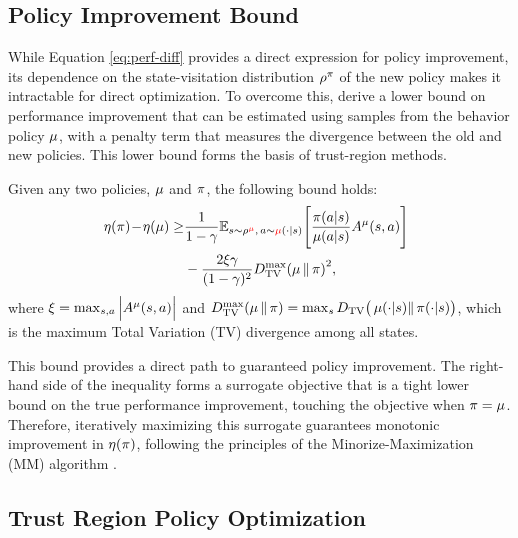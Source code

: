 \subsection{Policy Improvement Bound}  

While Equation \ref{eq:perf-diff} provides a direct expression for policy improvement, its dependence on the state-visitation distribution $\rho^{\operatorname*{{\textcolor{black}{\pi}}}}$ of the new policy makes it intractable for direct optimization. To overcome this, \citet{schulman2015trust} derive a lower bound on performance improvement that can be estimated using samples from the behavior policy $\operatorname*{{\textcolor{black}{\mu}}}$, with a penalty term that measures the divergence between the old and new policies. This lower bound forms the basis of trust-region methods.

\begin{theorem}\label{schulman2015trust}
	\citep{schulman2015trust, achiam2017constrained} Given any two policies, $\operatorname*{{\textcolor{black}{\mu}}}$ and $\operatorname*{{\textcolor{black}{\pi}}}$, the following bound holds:
    \begin{equation} 
    \label{eq:tv-bound}  
    \begin{split}
        \!\!\!
        \eta(\operatorname*{{\textcolor{black}{\pi}}}) \! - \! \eta(\operatorname*{{\textcolor{black}{\mu}}})  
        \ge & 
        \frac{1}{1-\gamma} \mathbb{E}_{s \sim \rho^{\operatorname*{{\textcolor{red}{\mu}}}},\, a \sim \operatorname*{{\textcolor{red}{\mu}}}(\cdot| s)} \Bigg[\frac{\operatorname*{{\textcolor{black}{\pi}}}(a| s)}{\operatorname*{{\textcolor{black}{\mu}}}(a| s)} A^{\operatorname*{{\textcolor{black}{\mu}}}}(s,a)\Bigg] \\ 
        & - \frac{2 \xi \gamma}{(1-\gamma)^2} {D_{\mathrm{TV}}^{\mathrm{max}}(\operatorname*{{\textcolor{black}{\mu}}} \| \operatorname*{{\textcolor{black}{\pi}}})}^2,
    \end{split}
    \end{equation}
    where $\xi = \max_{s,a} \Big| A^{\operatorname*{{\textcolor{black}{\mu}}}}(s,a) \Big|$ and $D_{\mathrm{TV}}^{\mathrm{max}}(\operatorname*{{\textcolor{black}{\mu}}} \| \operatorname*{{\textcolor{black}{\pi}}}) = \max_s D_{\mathrm{TV}}\big( \operatorname*{{\textcolor{black}{\mu}}}(\cdot| s) \|  \operatorname*{{\textcolor{black}{\pi}}}(\cdot| s) \big)$, which is the maximum Total Variation (TV) divergence among all states.
\end{theorem}

This bound provides a direct path to guaranteed policy improvement. The right-hand side of the inequality forms a surrogate objective that is a tight lower bound on the true performance improvement, touching the objective when $\operatorname*{{\textcolor{black}{\pi}}} = \operatorname*{{\textcolor{black}{\mu}}}$. Therefore, iteratively maximizing this surrogate guarantees monotonic improvement in $\eta(\operatorname*{{\textcolor{black}{\pi}}})$, following the principles of the Minorize-Maximization (MM) algorithm \citep{hunter2004tutorial, schulman2015trust}.  

\subsection{Trust Region Policy Optimization}

